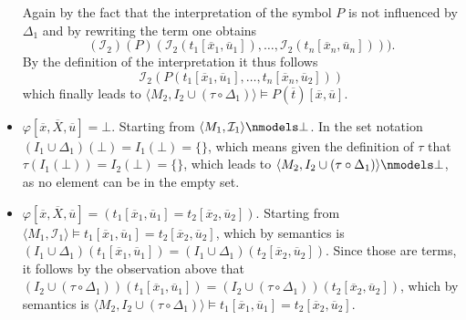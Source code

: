 \documentclass[11pt,a4paper]{article}
\begin{document}
\begin{itemize}[leftmargin=*]
\begin{equation*}
\end{equation*}
Again by the fact that the interpretation of the symbol $P$ is not influenced by $\Delta_1$ and by rewriting the term one obtains  
\begin{equation*}
(\mathcal{I}_2)(P)(\mathcal{I}_2(t_1[\overline{x}_1,  \overline{u}_1]), \dots , \mathcal{I}_2(t_n[\overline{x}_n, \overline{u}_n]))).
\end{equation*}
By the definition of the interpretation it thus follows 
\begin{equation*}
\mathcal{I}_2(P(t_1[\overline{x}_1,  \overline{u}_1], \dots , t_n[\overline{x}_n,\overline{u}_2]))
\end{equation*}
which finally leads to $\langle M_2, I_2 \cup (\tau \circ \Delta_1) \rangle \models  P(\overline{t})[\overline{x}, \overline{u}]$.\\

\item  $\varphi[\overline{x}, \overline{X}, \overline{u}]= \bot$. Starting from $\langle M_1, \mathcal{I}_1 \rangle \nmodels \bot $. In the set notation $(I_1\cup \Delta_1)(\bot )=I_1(\bot )= \{\}$, which means given the definition of $\tau$ that $\tau(I_1(\bot))=I_2(\bot) = \{\}$, which leads to $\langle M_2, I_2 \cup (\tau \circ \Delta_1) \rangle \nmodels \bot$, as no element can be in the empty set. \\


\item  $\varphi[\overline{x}, \overline{X}, \overline{u}]= (t_1[\overline{x}_1, \overline{u}_1] = t_2[\overline{x}_2, \overline{u}_2])$. Starting from $\langle M_1, \mathcal{I}_1 \rangle \models t_1[\overline{x}_1, \overline{u}_1] = t_2[\overline{x}_2, \overline{u}_2] $, which by semantics is $(I_1 \cup \Delta_1)(t_1[\overline{x}_1,  \overline{u}_1]) = (I_1 \cup \Delta_1)(t_2[\overline{x}_2,  \overline{u}_2]) $. Since those are terms, it follows by the observation above that $(I_2 \cup (\tau \circ \Delta_1))(t_1[\overline{x}_1,  \overline{u}_1]) = (I_2 \cup (\tau \circ \Delta_1))(t_2[\overline{x}_2, \overline{u}_2])$, which by semantics is $\langle M_2, I_2 \cup (\tau \circ \Delta_1) \rangle \models t_1[\overline{x}_1, \overline{u}_1] = t_2[\overline{x}_2, \overline{u}_2] $.\\


\end{itemize}
\end{document}
